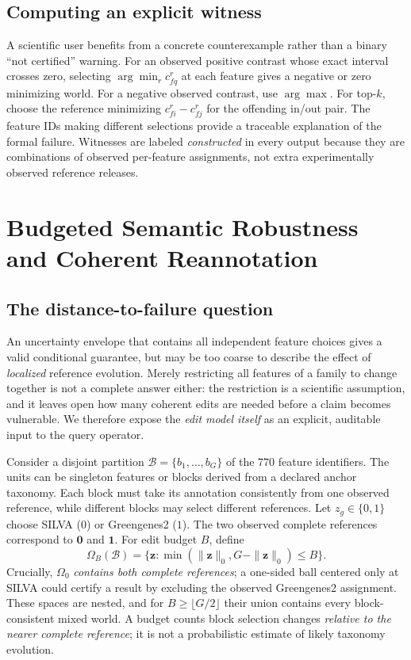 \documentclass[conference]{IEEEtran}
\newcommand{\OO}{\mathcal{\Omega}}
\newcommand{\B}{\mathcal{B}}
\begin{document}
\subsection{Computing an explicit witness}
A scientific user benefits from a concrete counterexample rather than a binary ``not certified'' warning. For an observed positive contrast whose exact interval crosses zero, selecting $\arg\min_r c_{fq}^{r}$ at each feature gives a negative or zero minimizing world. For a negative observed contrast, use $\arg\max$. For top-$k$, choose the reference minimizing $c_{fi}^{r}-c_{fj}^{r}$ for the offending in/out pair. The feature IDs making different selections provide a traceable explanation of the formal failure. Witnesses are labeled \emph{constructed} in every output because they are combinations of observed per-feature assignments, not extra experimentally observed reference releases.


\section{Budgeted Semantic Robustness and Coherent Reannotation}
\label{sec:budget}
\subsection{The distance-to-failure question}
An uncertainty envelope that contains all independent feature choices gives a valid conditional guarantee, but may be too coarse to describe the effect of \emph{localized} reference evolution. Merely restricting all features of a family to change together is not a complete answer either: the restriction is a scientific assumption, and it leaves open how many coherent edits are needed before a claim becomes vulnerable. We therefore expose the \emph{edit model itself} as an explicit, auditable input to the query operator.

Consider a disjoint partition $\B=\{b_1,\ldots,b_G\}$ of the $770$ feature identifiers. The units can be singleton features or blocks derived from a declared anchor taxonomy. Each block must take its annotation consistently from one observed reference, while different blocks may select different references. Let $z_g\in\{0,1\}$ choose SILVA ($0$) or Greengenes2 ($1$). The two observed complete references correspond to $\mathbf 0$ and $\mathbf 1$. For edit budget $B$, define
\begin{equation}
\OO_B(\B)=\{\mathbf z:\min(\|\mathbf z\|_0,G-\|\mathbf z\|_0)\le B\}.
\label{eq:budgetworlds}
\end{equation}
Crucially, $\OO_0$ \emph{contains both complete references}; a one-sided ball centered only at SILVA could certify a result by excluding the observed Greengenes2 assignment. These spaces are nested, and for $B\ge\lfloor G/2\rfloor$ their union contains every block-consistent mixed world. A budget counts block selection changes \emph{relative to the nearer complete reference}; it is not a probabilistic estimate of likely taxonomy evolution.
\end{document}

